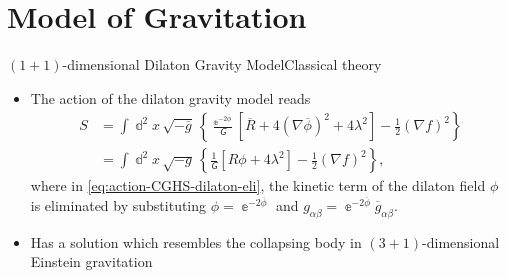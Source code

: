 \documentclass{beamer}
\newcommand{\ee}{{\Bbbe}}
\newcommand{\rbr}[1]{{\left(#1\right)}}
\newcommand{\sbr}[1]{{\left[#1\right]}}
\newcommand{\cbr}[1]{{\left\{#1\right\}}}
\newcommand{\dd}{\Bbbd}
\newcommand{\ol}[1]{{\overline{{#1}}}}
\newcommand{\nG}{\mitsansG} %
\begin{document}
\section{Model of Gravitation}

\begin{frame}[allowframebreaks]{$\rbr{1+1}$-dimensional Dilaton Gravity 
Model}{Classical theory \cite{Callan1992,Demers1996,Ashtekar2011}}%

\begin{itemize}
\item The action of the dilaton gravity model reads
\begin{align}
S &= \int \dd^2 x\,\sqrt{-\ol{g}}\,\cbr{\frac{\ee^{-2\ol{\phi}}}{\nG}
\sbr{\ol{R}+4\rbr{\nabla \ol{\phi}}^2 + 4\lambda^2}
-\frac{1}{2}\rbr{\nabla f}^2} \nonumber \\
&= \int \dd^2 x\,\sqrt{-g}\,\cbr{\frac{1}{\nG}\sbr{R\phi + 4\lambda^2}
-\frac{1}{2}\rbr{\nabla f}^2},
\label{eq:action-CGHS-dilaton-eli}
\end{align}
where in \cref{eq:action-CGHS-dilaton-eli}, the \alert{kinetic term} of the 
dilaton field $\phi$ is eliminated by substituting $\phi = \ee^{-2\ol{\phi}}$ 
and $g_{\alpha\beta} = \ee^{-2\ol{\phi}} \ol{g}_{\alpha\beta}$.
\item Has a solution which \alert{resembles} the collapsing body in 
$\rbr{3+1}$-dimensional Einstein gravitation
\end{itemize}



\begin{center}

\end{center}

\end{frame}
\end{document}
